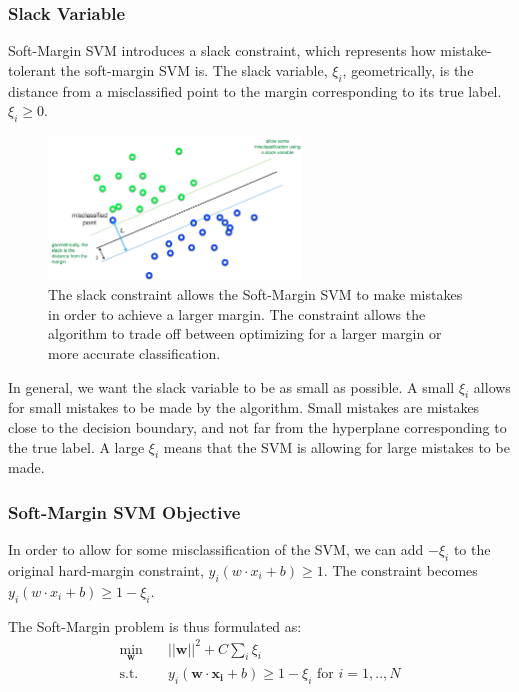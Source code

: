 \documentclass[11pt]{article}
\begin{document}
\subsubsection{Slack Variable}

Soft-Margin SVM introduces a slack constraint, which represents how mistake-tolerant the soft-margin SVM is. The slack variable, $ \xi_i$, geometrically, is the distance from a misclassified point to the margin corresponding to its true label. $\xi_i\geq 0$.

\begin{figure}[H]
    \centering
    \includegraphics[width=0.6\textwidth]{images/slack_variable.png}
    \caption{The slack constraint allows the Soft-Margin SVM to make mistakes in order to achieve a larger margin. The constraint allows the algorithm to trade off between optimizing for a larger margin or more accurate classification.}
    \label{fig:my_label}
\end{figure}

In general, we want the slack variable to be as small as possible. A small $\xi_i$ allows for small mistakes to be made by the algorithm. Small mistakes are mistakes close to the decision boundary, and not far from the hyperplane corresponding to the true label. A large $\xi_i$ means that the SVM is allowing for large mistakes to be made.

\subsubsection{Soft-Margin SVM Objective}
In order to allow for some misclassification of the SVM, we can add $- \xi_i$ to the original hard-margin constraint, $y_i(w \cdot x_i + b) \geq 1$. The constraint becomes $y_i(w \cdot x_i + b) \geq 1 - \xi_i$. 

The Soft-Margin problem is thus formulated as:
\begin{equation}
\begin{aligned}
\min_{\mathbf{w}} \quad & ||\mathbf{w}||^2 + C\sum_i \xi_i \\
\textrm{s.t.} \quad &
 y_i(\mathbf{w} \cdot \mathbf{x_{i}} +b) \geq 1 -\xi_i \text{ for } i = 1, .., N\\
\end{aligned}
\end{equation}
\end{document}
